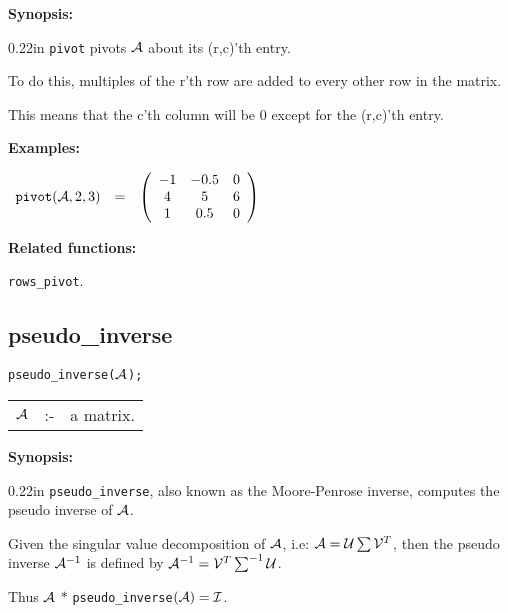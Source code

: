 {\bf Synopsis:} %

\begin{addtolength}{\leftskip}{0.22in}
{\tt pivot} pivots ${\cal A}$ about its (r,c)'th entry.

To do this, multiples of the r'th row are added to every
     other row in the matrix.

This means that the c'th column
                will be 0 except for the (r,c)'th entry.

\end{addtolength}

{\bf Examples:}

\begin{flushleft}
\hspace*{0.1in}
\begin{math}
\begin{array}{ccc}
{\tt pivot}({\cal A},2,3) & = &
        \left( \begin{array}{ccc} -1 & -0.5 & 0 \\ 4 & 5 & 6 \\ 1 & 0.5
& 0
 \end{array} \right)
\end{array}
\end{math}
\end{flushleft}

{\bf Related functions:}

\hspace*{0.175in} {\tt rows\_pivot}.


\subsection{pseudo\_inverse}


\hspace*{0.175in} {\tt pseudo\_inverse(${\cal A}$);}

\hspace*{0.1in}
\begin{tabular}{l l l}
${\cal A}$ &:-& a matrix.
\end{tabular}

{\bf Synopsis:} %

\begin{addtolength}{\leftskip}{0.22in}
{\tt pseudo\_inverse}, also known as the Moore-Penrose inverse, computes
the pseudo inverse of ${\cal A}$.

Given the singular value decomposition of ${\cal A}$, i.e: ${\cal A} =
{\cal U}
\sum {\cal V}^T$, then the pseudo inverse ${\cal A}^{-1}$ is defined
by ${\cal A}^{-1} = {\cal V}^T \sum^{-1} {\cal U}$.

Thus ${\cal A}$ $ * $ {\tt pseudo\_inverse}$({\cal A}) = {\cal I}$.

\end{addtolength}

